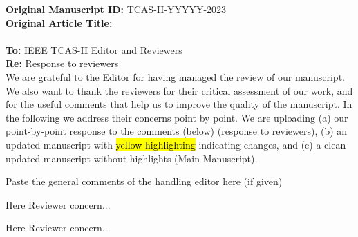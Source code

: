 \documentclass[./IEEE_Journal.tex]{subfiles}
\begin{document}
\onecolumn
\vspace{2mm}
\noindent \textbf{Original Manuscript ID:} TCAS-II-YYYYY-2023  \\  
\textbf{Original Article Title:}   \\
\vspace{2mm}
\\\textbf{To:} IEEE TCAS-II Editor and Reviewers \\
\textbf{Re:} Response to reviewers \\

We are grateful to the Editor for having managed the review of our manuscript. We also want to thank the reviewers for their critical assessment of our work, and for the useful comments that help us to improve the quality of the manuscript.
In the following we address their concerns point by point. 
We are uploading (a) our point-by-point response to the comments (below) (response to reviewers), (b) an updated manuscript with \hl{yellow highlighting} indicating changes, and (c) a clean updated manuscript without highlights (Main Manuscript).

\reviewersection 
Paste the general comments of the handling editor here (if given)


\begin{point}
     Here Reviewer concern... 
\end{point}


\begin{point}
     Here Reviewer concern...
\end{point}

\end{document}

